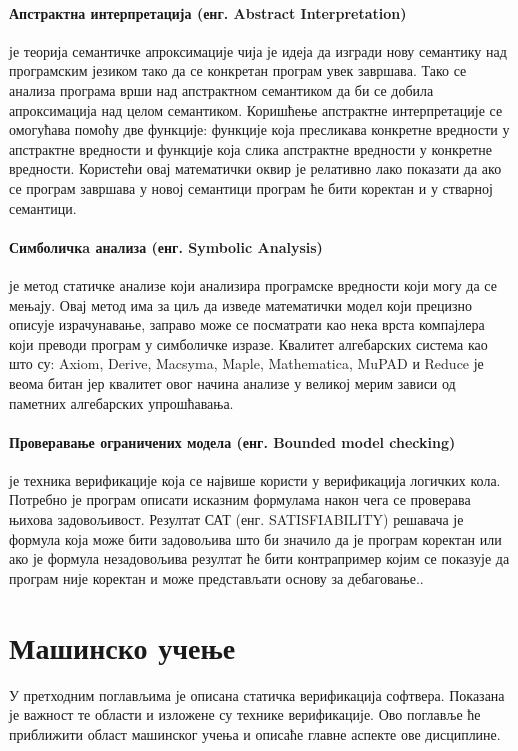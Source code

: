 \documentclass[a4paper]{article}
\begin{document}
{\paragraph{Апстрактна интерпретација (енг.  Abstract Interpretation)} је теорија семантичке апроксимације чија је идеја да изгради нову семантику над програмским језиком тако да се конкретан програм увек завршава. Тако се анализа програма врши над апстрактном семантиком да би се добила апроксимација над целом семантиком. Коришћење апстрактне интерпретације се омогућава помоћу две функције: функције која пресликава конкретне вредности у апстрактне вредности и функције која слика апстрактне вредности у конкретне вредности.  Користећи овај математички оквир је релативно лако показати да ако се програм завршава у новој семантици програм ће бити коректан и у стварној семантици.


\paragraph{Симболичкa анализа (енг. Symbolic Analysis)} је метод статичке анализе који анализира програмске вредности који могу да се мењају. Овај метод има за циљ да изведе математички модел који прецизно описује израчунавање, заправо може се посматрати као нека врста компајлера који преводи програм у симболичке изразе. Квалитет алгебарских система као што су: Axiom, Derive, Macsyma, Maple, Mathematica, MuPAD и Reduce је веома битан јер квалитет овог начина анализе у великој мерим зависи од паметних алгебарских упрошћавања.


\paragraph{Проверавање ограничених модела (енг. Bounded model checking)} је техника верификације која се највише користи у верификација логичких кола. Потребно је програм описати исказним формулама након чега се проверава њихова задовољивост. Резултат САТ (енг. SATISFIABILITY) решавача је формула која може бити задовољива што би значило да је програм коректан или ако је формула незадовољива резултат ће бити контрапример којим се показује да програм није коректан и може представљати основу за дебаговање.\cite{survey}\cite{dkw2008}.

\section{Машинско учење}
У претходним поглављима је описана статичка верификација софтвера. Показана је важност те области и изложене су технике верификације. Ово поглавље ће приближити област машинског учења и описаће главне аспекте ове дисциплине.

}
\end{document}
